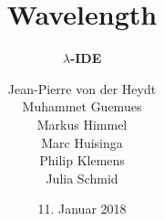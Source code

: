 \documentclass[10pt]{beamer}
\title[] %
{ %
      \textbf{Wavelength}
}
\subtitle[$\lambda$-IDE]
{
      \textbf{$\lambda$-IDE}
}
\author[wavelength]
{      Jean-Pierre von der Heydt \\  
	   Muhammet Guemues \\
       Markus Himmel \\
       Marc Huisinga \\
       Philip Klemens \\ 
       Julia Schmid   
}
\institute[]
{
      
  
}
\date{11. Januar 2018}
\begin{document}

{
\begin{frame}[plain]
\maketitle
\end{frame}
}


\end{document}

